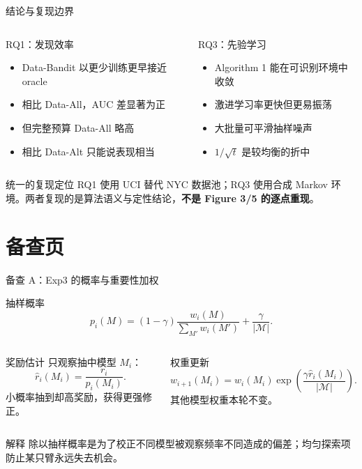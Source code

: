 \ifdefined\showall
\begin{frame}{结论与复现边界}
\begin{columns}[T,onlytextwidth]
\begin{exampleblock}{RQ1：发现效率}
\begin{itemize}
  \item Data-Bandit 以更少训练更早接近 oracle
  \item 相比 Data-All，AUC 差显著为正
  \item 但完整预算 Data-All 略高
  \item 相比 Data-Alt 只能说表现相当
\end{itemize}
\end{exampleblock}
\begin{exampleblock}{RQ3：先验学习}
\begin{itemize}
  \item Algorithm 1 能在可识别环境中收敛
  \item 激进学习率更快但更易振荡
  \item 大批量可平滑抽样噪声
  \item $1/\sqrt t$ 是较均衡的折中
\end{itemize}
\end{exampleblock}
\end{columns}
\begin{alertblock}{统一的复现定位}
RQ1 使用 UCI 替代 NYC 数据池；RQ3 使用合成 Markov 环境。两者复现的是算法语义与定性结论，\textbf{不是 Figure 3/5 的逐点重现}。
\end{alertblock}
\end{frame}
\fi

\ifdefined\showall
\section*{备查页}

\begin{frame}{备查 A：Exp3 的概率与重要性加权}
\begin{block}{抽样概率}
\[
p_i(M)=(1-\gamma)\frac{w_i(M)}{\sum_{M'}w_i(M')}+\frac{\gamma}{|\mathcal M|}.
\]
\end{block}
\begin{columns}[T,onlytextwidth]
\begin{block}{奖励估计}
只观察抽中模型 $M_i$：
\[
\widehat r_i(M_i)=\frac{r_i}{p_i(M_i)}.
\]
小概率抽到却高奖励，获得更强修正。
\end{block}
\begin{block}{权重更新}
\[
w_{i+1}(M_i)=w_i(M_i)\exp\!\left(\frac{\gamma\widehat r_i(M_i)}{|\mathcal M|}\right).
\]
其他模型权重本轮不变。
\end{block}
\end{columns}
\begin{alertblock}{解释}
除以抽样概率是为了校正不同模型被观察频率不同造成的偏差；均匀探索项防止某只臂永远失去机会。
\end{alertblock}
\end{frame}

